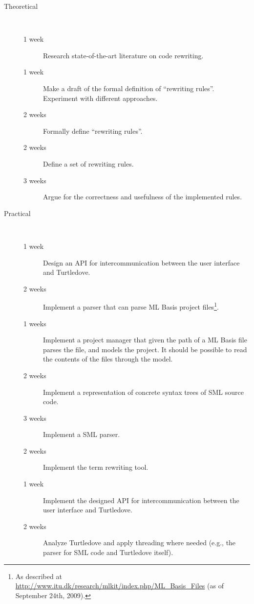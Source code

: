 \documentclass[a4paper,oneside]{article}
\begin{document}
\begin{description}
\item[Theoretical] \ \\
\begin{description}
\item[1 week] Research state-of-the-art literature on code rewriting.

\item[1 week] Make a draft of the formal definition of ``rewriting rules''. Experiment with
  different approaches.

\item[2 weeks] Formally define ``rewriting rules''.

\item[2 weeks] Define a set of rewriting rules.

\item[3 weeks] Argue for the correctness and usefulness of the implemented rules.
\end{description}

\item[Practical] \ \\
\begin{description}

\item[1 week] Design an API for intercommunication between the user interface and Turtledove.

\item[2 weeks] Implement a parser that can parse ML Basis project files\footnote{As described at
    \url{http://www.itu.dk/research/mlkit/index.php/ML_Basis_Files} (as of September 24th, 2009).}.

\item[1 weeks] Implement a project manager that given the path of a ML Basis file parses the file,
  and models the project. It should be possible to read the contents of the files through the model.

\item[2 weeks] Implement a representation of concrete syntax trees of SML source code.

\item[3 weeks] Implement a SML parser.

\item[2 weeks] Implement the term rewriting tool.

\item[1 week] Implement the designed API for intercommunication between the user interface and
  Turtledove.

\item[2 weeks] Analyze Turtledove and apply threading where needed (e.g., the parser for SML code
  and Turtledove itself).
\end{description}
\end{description}
\end{document}
